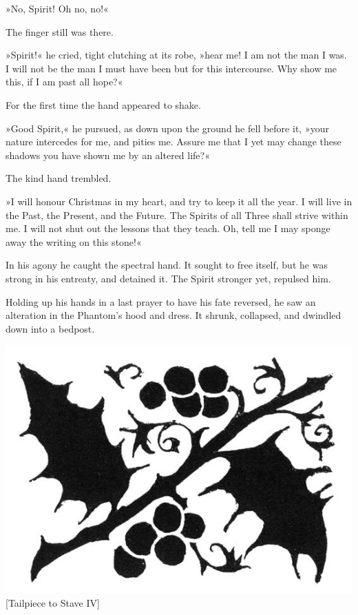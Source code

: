 »No, Spirit! Oh no, no!«

The finger still was there.

»Spirit!« he cried, tight clutching at its robe, »hear me! I am not the man I was. I will not be the man I must have been but for this intercourse. Why show me this, if I am past all hope?«

For the first time the hand appeared to shake.

»Good Spirit,« he pursued, as down upon the ground he fell before it, »your nature intercedes for me, and pities me. Assure me that I yet may change these shadows you have shown me by an altered life?«

The kind hand trembled.

»I will honour Christmas in my heart, and try to keep it all the year. I will live in the Past, the Present, and the Future. The Spirits of all Three shall strive within me. I will not shut out the lessons that they teach. Oh, tell me I may sponge away the writing on this stone!«

In his agony he caught the spectral hand. It sought to free itself, but he was strong in his entreaty, and detained it. The Spirit stronger yet, repulsed him.

Holding up his hands in a last prayer to have his fate reversed, he saw an alteration in the Phantom's hood and dress. It shrunk, collapsed, and dwindled down into a bedpost.



\begin{center}
\includegraphics[width=.3\textwidth]{gs056}
[Tailpiece to Stave IV]{}
\end{center}

